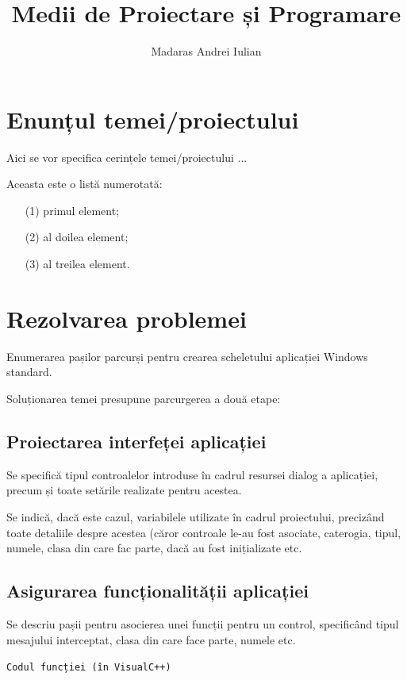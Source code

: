 \documentclass{amsart}
\title{Medii de Proiectare și Programare}
\author{Madaras Andrei Iulian}
\begin{document}
\maketitle

\section{Enunțul temei/proiectului}

Aici se vor specifica cerințele temei/proiectului ...

Aceasta este o list\u{a} numerotat\u{a}:
\begin{itemize}
\item[(1)] primul element;
\item[(2)] al doilea element;
\item[(3)] al treilea element.
\end{itemize}

\section{Rezolvarea problemei}

Enumerarea pașilor parcurși pentru crearea scheletului aplicației Windows standard.

Soluționarea temei presupune parcurgerea a două etape:

\subsection{Proiectarea interfeței aplicației}

Se specifică tipul controalelor introduse în cadrul resursei dialog a aplicației, precum și toate setările realizate pentru acestea. 

Se indică, dacă este cazul, variabilele utilizate în cadrul proiectului, precizând toate detaliile despre acestea (căror controale le-au fost asociate, caterogia, tipul, numele, clasa din care fac parte, dacă au fost inițializate etc.

\subsection{Asigurarea funcționalității aplicației}

Se descriu pașii pentru asocierea unei funcții pentru un control, specificând tipul mesajului interceptat, clasa din care face parte, numele etc.

\texttt{Codul funcției (\^{i}n VisualC++)}
\end{document}
